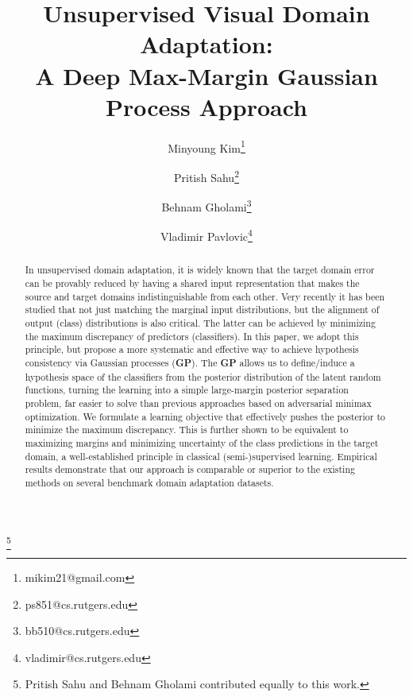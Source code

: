 \documentclass[10pt,letterpaper]{article}
\newcommand\blfootnote[1]{\begingroup
  \renewcommand\thefootnote{}\footnote{#1}\addtocounter{footnote}{-1}\endgroup
}
\begin{document}
\setlength{\abovedisplayskip}{2pt}
\setlength{\belowdisplayskip}{2pt}

\title{Unsupervised Visual Domain Adaptation:\\
A Deep Max-Margin Gaussian Process Approach}



\author[1,2]{Minyoung Kim\thanks{mikim21@gmail.com}}
\author[1]{Pritish Sahu\thanks{ps851@cs.rutgers.edu}}
\author[1]{Behnam Gholami\thanks{bb510@cs.rutgers.edu}}
\author[1]{Vladimir Pavlovic\thanks{vladimir@cs.rutgers.edu}}





\maketitle



\blfootnote{Pritish Sahu and Behnam Gholami contributed equally to this work.}

\begin{abstract}
In unsupervised domain adaptation, it is widely known that the target domain error can be provably reduced by having a shared input representation that makes the source and target domains indistinguishable from each other. Very recently it has been studied that not just matching the marginal input distributions, but the alignment of output (class) distributions is also critical. The latter can be achieved by minimizing the maximum discrepancy of predictors (classifiers). In this paper, we adopt this principle, but propose a more systematic and effective way to achieve hypothesis consistency via Gaussian processes (\textbf{GP}). The \textbf{GP} allows us to define/induce a hypothesis space of the classifiers from the posterior distribution of the latent random functions, turning the learning into a simple large-margin posterior separation problem, far easier to solve than previous approaches based on adversarial minimax optimization. We formulate a learning objective that effectively pushes the posterior to minimize the maximum discrepancy. This is further shown to be equivalent to maximizing margins and minimizing uncertainty of the class predictions in the target domain, a well-established principle in classical (semi-)supervised learning. Empirical results demonstrate that our approach is comparable or superior to the existing methods on several benchmark domain adaptation datasets.
\end{abstract}
\end{document}
